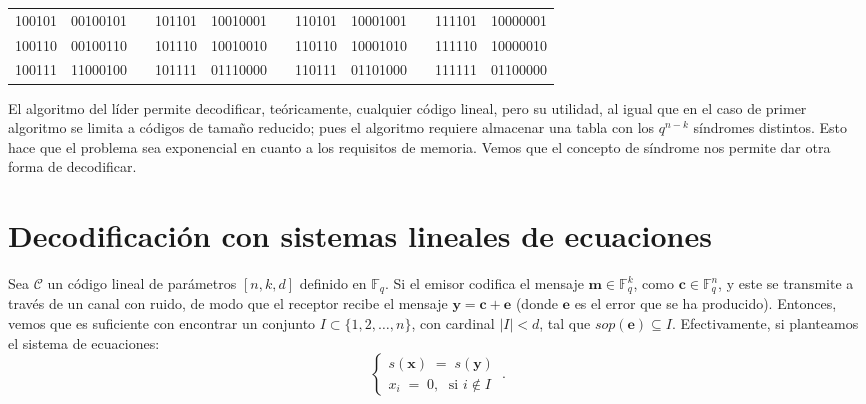 \documentclass[11pt,spanish]{book}
\begin{document}
\begin{table}[H]
\begin{tabular}{lllllllllll}
\multicolumn{1}{|l|}{100101} & \multicolumn{1}{l|}{00100101} & \multicolumn{1}{l|}{} & \multicolumn{1}{l|}{101101} & \multicolumn{1}{l|}{10010001} & \multicolumn{1}{l|}{} & \multicolumn{1}{l|}{110101} & \multicolumn{1}{l|}{10001001} & \multicolumn{1}{l|}{} & \multicolumn{1}{l|}{111101} & \multicolumn{1}{l|}{10000001} \\ \cline{1-2} \cline{4-5} \cline{7-8} \cline{10-11} 
\multicolumn{1}{|l|}{100110} & \multicolumn{1}{l|}{00100110} & \multicolumn{1}{l|}{} & \multicolumn{1}{l|}{101110} & \multicolumn{1}{l|}{10010010} & \multicolumn{1}{l|}{} & \multicolumn{1}{l|}{110110} & \multicolumn{1}{l|}{10001010} & \multicolumn{1}{l|}{} & \multicolumn{1}{l|}{111110} & \multicolumn{1}{l|}{10000010} \\ \cline{1-2} \cline{4-5} \cline{7-8} \cline{10-11} 
\multicolumn{1}{|l|}{100111} & \multicolumn{1}{l|}{11000100} & \multicolumn{1}{l|}{} & \multicolumn{1}{l|}{101111} & \multicolumn{1}{l|}{01110000} & \multicolumn{1}{l|}{} & \multicolumn{1}{l|}{110111} & \multicolumn{1}{l|}{01101000} & \multicolumn{1}{l|}{} & \multicolumn{1}{l|}{111111} & \multicolumn{1}{l|}{01100000} \\ \cline{1-2} \cline{4-5} \cline{7-8} \cline{10-11} 
\end{tabular}
\end{table}

El algoritmo del líder permite decodificar, teóricamente, cualquier código lineal, pero su utilidad, al igual que en el caso de primer algoritmo se limita a códigos de tamaño reducido; pues el algoritmo requiere almacenar una tabla con los $q^{n-k}$ síndromes distintos. Esto hace que el problema sea exponencial en cuanto a los requisitos de memoria. Vemos que el concepto de síndrome nos permite dar otra forma de decodificar.
\section{Decodificación con sistemas lineales de ecuaciones}
\hypertarget{sistemalinealcodigos}{}
 Sea $\mathcal{C}$ un código lineal de parámetros $[n,k,d]$ definido en $\mathbb{F}_q$. Si el emisor codifica el mensaje $\mathbf{m}\in \mathbb{F}_q^{k}$, como $\mathbf{c}\in \mathbb{F}_q^{n}$, y este se transmite a través de un canal con ruido, de modo que el receptor recibe el mensaje $\mathbf{y}=\mathbf{c}+\mathbf{e}$ (donde $\mathbf{e}$ es el error que se ha producido). Entonces, vemos que es suficiente con encontrar un conjunto $I\subset \{1,2,\ldots,n\}$, con cardinal $|I|<d$, tal que \hyperlink{soporte}{$sop(\mathbf{e})\subseteq I$}. Efectivamente, si planteamos el sistema de ecuaciones:
\begin{equation}
\begin{cases}
    s(\mathbf{x})\;=\;s(\mathbf{y})\\
    x_{i}\;=\;0,\; \text{ si } i\notin I
    \end{cases}\,.
\end{equation}
\end{document}
